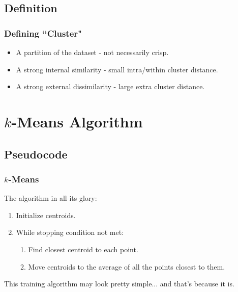 \documentclass{beamer}
\begin{document}
\subsection{Definition}
\begin{frame}
  \frametitle{Defining ``Cluster"}
  \begin{itemize}
    \item A partition of the dataset - not necessarily crisp.
    \item A strong internal similarity - small intra/within cluster distance.
    \item A strong external dissimilarity - large extra cluster distance.
  \end{itemize}
\end{frame}

\section{$k$-Means Algorithm}
\subsection{Pseudocode}
\begin{frame}
  \frametitle{$k$-Means}
  The algorithm in all its glory: \vspace{4mm}
  \begin{enumerate}
    \item Initialize centroids. \vspace{2mm}
    \item While stopping condition not met: \vspace{2mm}
    \begin{enumerate}
      \item Find closest centroid to each point. \vspace{1mm}
      \item Move centroids to the average of all the points closest to them.
    \end{enumerate}
  \end{enumerate} \vspace{4mm} \pause

  This training algorithm may look pretty simple... \pause and that's because it is.

\end{frame}
\end{document}

